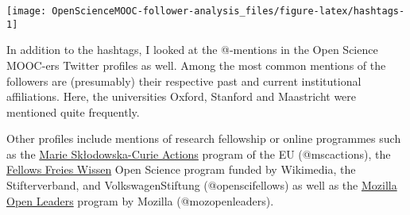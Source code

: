 \documentclass[]{article}
\newenvironment{Shaded}{\begin{snugshade}}{\end{snugshade}}
\newcommand{\KeywordTok}[1]{\textcolor[rgb]{0.13,0.29,0.53}{\textbf{#1}}}
\newcommand{\DataTypeTok}[1]{\textcolor[rgb]{0.13,0.29,0.53}{#1}}
\newcommand{\DecValTok}[1]{\textcolor[rgb]{0.00,0.00,0.81}{#1}}
\newcommand{\FloatTok}[1]{\textcolor[rgb]{0.00,0.00,0.81}{#1}}
\newcommand{\CharTok}[1]{\textcolor[rgb]{0.31,0.60,0.02}{#1}}
\newcommand{\StringTok}[1]{\textcolor[rgb]{0.31,0.60,0.02}{#1}}
\newcommand{\CommentTok}[1]{\textcolor[rgb]{0.56,0.35,0.01}{\textit{#1}}}
\newcommand{\OtherTok}[1]{\textcolor[rgb]{0.56,0.35,0.01}{#1}}
\newcommand{\OperatorTok}[1]{\textcolor[rgb]{0.81,0.36,0.00}{\textbf{#1}}}
\newcommand{\NormalTok}[1]{#1}
\begin{document}
\begin{Shaded}
\end{Shaded}

\begin{center}\texttt{[image: OpenScienceMOOC-follower-analysis\_files/figure-latex/hashtags-1]} \end{center}

In addition to the hashtags, I looked at the @-mentions in the Open
Science MOOC-ers Twitter profiles as well. Among the most common
mentions of the followers are (presumably) their respective past and
current institutional affiliations. Here, the universities Oxford,
Stanford and Maastricht were mentioned quite frequently.

Other profiles include mentions of research fellowship or online
programmes such as the
\href{https://ec.europa.eu/programmes/horizon2020/en/h2020-section/marie-sklodowska-curie-actions}{Marie
Skłodowska-Curie Actions} program of the EU (@mscactions), the
\href{https://www.stifterverband.org/freies-wissen}{Fellows Freies
Wissen} Open Science program funded by Wikimedia, the Stifterverband,
and VolkswagenStiftung (@openscifellows) as well as the
\href{https://foundation.mozilla.org/en/opportunity/mozilla-open-leaders/}{Mozilla
Open Leaders} program by Mozilla (@mozopenleaders).
\end{document}
